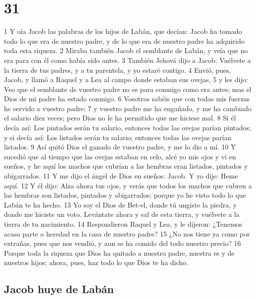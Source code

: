 \chapter{31}

1 Y oía Jacob las palabras de los hijos de Labán, que decían: Jacob ha tomado todo lo que era de nuestro padre, y de lo que era de nuestro padre ha adquirido toda esta riqueza.
2 Miraba también Jacob el semblante de Labán, y veía que no era para con él como había sido antes.
3 También Jehová dijo a Jacob: Vuélvete a la tierra de tus padres, y a tu parentela, y yo estaré contigo.
4 Envió, pues, Jacob, y llamó a Raquel y a Lea al campo donde estaban sus ovejas,
5 y les dijo: Veo que el semblante de vuestro padre no es para conmigo como era antes; mas el Dios de mi padre ha estado conmigo.
6 Vosotras sabéis que con todas mis fuerzas he servido a vuestro padre;
7 y vuestro padre me ha engañado, y me ha cambiado el salario diez veces; pero Dios no le ha permitido que me hiciese mal.
8 Si él decía así: Los pintados serán tu salario, entonces todas las ovejas parían pintados; y si decía así: Los listados serán tu salario; entonces todas las ovejas parían listados.
9 Así quitó Dios el ganado de vuestro padre, y me lo dio a mí.
10 Y sucedió que al tiempo que las ovejas estaban en celo, alcé yo mis ojos y vi en sueños, y he aquí los machos que cubrían a las hembras eran listados, pintados y abigarrados.
11 Y me dijo el ángel de Dios en sueños: Jacob. Y yo dije: Heme aquí.
12 Y él dijo: Alza ahora tus ojos, y verás que todos los machos que cubren a las hembras son listados, pintados y abigarrados; porque yo he visto todo lo que Labán te ha hecho.
13 Yo soy el Dios de Bet-el, donde tú ungiste la piedra, y donde me hiciste un voto. Levántate ahora y sal de esta tierra, y vuélvete a la tierra de tu nacimiento.
14 Respondieron Raquel y Lea, y le dijeron: ¿Tenemos acaso parte o heredad en la casa de nuestro padre?
15 ¿No nos tiene ya como por extrañas, pues que nos vendió, y aun se ha comido del todo nuestro precio?
16 Porque toda la riqueza que Dios ha quitado a nuestro padre, nuestra es y de nuestros hijos; ahora, pues, haz todo lo que Dios te ha dicho.

\section{Jacob huye de Labán}

